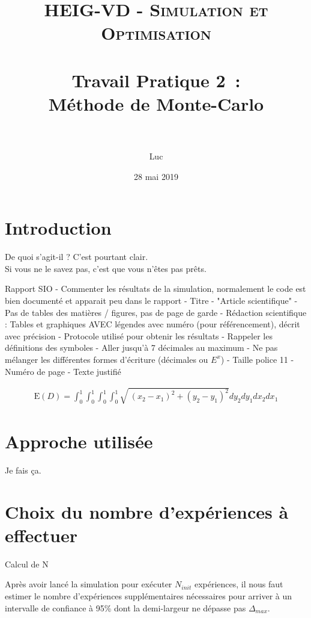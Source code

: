 \documentclass[paper=a4, fontsize=11pt]{scrartcl}
\title{
  \normalfont \normalsize
  \textsc{HEIG-VD - Simulation et Optimisation} \\[10pt]
  \horrule{1pt} \\[0.4cm] %
  \huge Travail Pratique 2~:\\Méthode de Monte-Carlo \\
  \horrule{2pt} \\[0.4cm] %
}
\author{Luc \bsc{Wachter}}
\date{28 mai 2019}
\begin{document}
\lstset{language=Java}

\maketitle

\section{Introduction}
De quoi s'agit-il ? C'est pourtant clair.
\\
Si vous ne le savez pas, c'est que vous n'êtes pas prêts.

Rapport SIO
- Commenter les résultats de la simulation, normalement le code est bien documenté et apparait peu dans le rapport
- Titre
-  "Article scientifique"
- Pas de tables des matières / figures, pas de page de garde
- Rédaction scientifique : Tables et graphiques AVEC légendes avec numéro (pour référencement), décrit avec précision
- Protocole utilisé pour obtenir les résultats
- Rappeler les définitions des symboles
- Aller jusqu'à 7 décimales au maximum
- Ne pas mélanger les différentes formes d'écriture (décimales ou $E^x$)
- Taille police 11
- Numéro de page
- Texte justifié


\begin{align*}
  \text{E}(D) = \int _0^1\int _0^1\int _0^1\int _0^1\sqrt{\:\left(x_2-x_1\right)^2+\left(y_2-y_1\right)^2}dy_2dy_1dx_2dx_1
\end{align*}

\newpage

\section{Approche utilisée}
Je fais ça.

\section{Choix du nombre d'expériences à effectuer}
Calcul de N

Après avoir lancé la simulation pour exécuter $N_{init}$ expériences, il nous faut estimer le nombre d'expériences supplémentaires nécessaires pour arriver à un intervalle de confiance à 95\% dont la demi-largeur ne dépasse pas $\Delta_{max}$.
\end{document}

